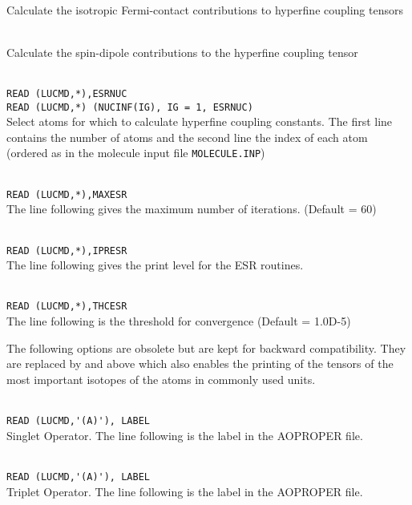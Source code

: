 \begin{description}
\item{} \\
Calculate the isotropic Fermi-contact contributions to hyperfine coupling tensors

\item{} \\
Calculate the spin-dipole contributions to the hyperfine coupling tensor

\item{} \\
\verb|READ (LUCMD,*),ESRNUC |\\
\verb|READ (LUCMD,*) (NUCINF(IG), IG = 1, ESRNUC) | \\
Select atoms for which to calculate hyperfine coupling constants.
The first line contains  the number of atoms and the second line the
index of each atom (ordered as in the molecule input file \texttt{MOLECULE.INP})

\item{}      \\
\verb|READ (LUCMD,*),MAXESR |\\
   The line following gives the maximum number of iterations.  (Default = 60)

\item{}     \\
\verb|READ (LUCMD,*),IPRESR |\\
   The line following gives the print level for the ESR routines.

\item{}     \\
\verb|READ (LUCMD,*),THCESR|\\
   The line following is the threshold for convergence (Default = 1.0D-5)

\end{description}
The following options are obsolete but are kept for backward compatibility.
They are replaced by  and  above which also
enables the printing of the tensors of the most important isotopes of the
atoms in commonly used units.
\begin{description}

\item{}    \\
\verb|READ (LUCMD,'(A)'), LABEL|\\
   Singlet Operator. The line following is the label in the AOPROPER file.

\item{}    \\
\verb|READ (LUCMD,'(A)'), LABEL |\\
   Triplet Operator. The line following is the label in the AOPROPER file.


\end{description}


